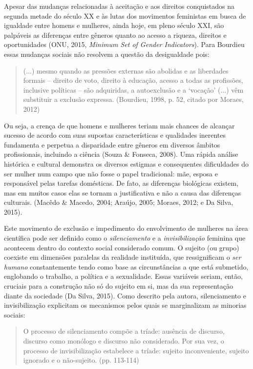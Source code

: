 Apesar das mudanças relacionadas à aceitação e aos direitos conquistados na segunda metade do século XX e às lutas dos movimentos feministas em busca de igualdade entre homens e mulheres, ainda hoje, em pleno século XXI, são palpáveis as diferenças entre gêneros quanto ao acesso a riqueza, direitos e oportunidades (ONU, 2015, \textit{Minimum Set of Gender Indicators}). Para Bourdieu essas mudanças sociais não resolvem a questão da desigualdade pois:

\begin{quote}
(...) mesmo quando as pressões externas são abolidas e as liberdades formais – direito de voto, direito à educação, acesso a todas as profissões, inclusive políticas – são adquiridas, a autoexclusão e a ‘vocação’ (...) vêm substituir a exclusão expressa. (Bourdieu, 1998, p. 52, citado por Moraes, 2012)
\end{quote}

Ou seja, a crença de que homens e mulheres teriam mais chances de alcançar sucesso de acordo com suas supostas características e qualidades inerentes fundamenta e perpetua a disparidade entre gêneros em diversos âmbitos profissionais, incluindo a ciência (Souza \& Fonseca, 2008). Uma rápida análise histórica e cultural demonstra os diversos estigmas e consequentes dificuldades do ser mulher num campo que não fosse o papel tradicional: mãe, esposa e responsável pelas tarefas domésticas. De fato, as diferenças biológicas existem, mas em muitos casos elas se tornam a justificativa e não a causa das diferenças culturais. (Macêdo \& Macedo, 2004; Araújo, 2005; Moraes, 2012; e Da Silva, 2015).

Este movimento de exclusão e impedimento do envolvimento de mulheres na área científica pode ser definido como o \textit{silenciamento} e a \textit{invisibilização} feminina que acontecem dentro do contexto social considerado comum. O sujeito (ou grupo) coexiste em dimensões paralelas da realidade instituída, que ressignificam o \textit{ser humano} constantemente tendo como base as circunstâncias a que está submetido, englobando o trabalho, a política e a sexualidade. Essas variáveis seriam, então, cruciais para a construção não só do sujeito em si, mas da sua representação diante da sociedade (Da Silva, 2015). Como descrito pela autora, silenciamento e invisibilização explicitam os mecanismos pelos quais se marginalizam as minorias sociais:

\begin{quote}
O processo de silenciamento compõe a tríade: ausência de discurso, discurso como monólogo e discurso não considerado. Por sua vez, o processo de invisibilização estabelece a tríade: sujeito inconveniente, sujeito ignorado e o não-sujeito. (pp. 113-114)
\end{quote}

